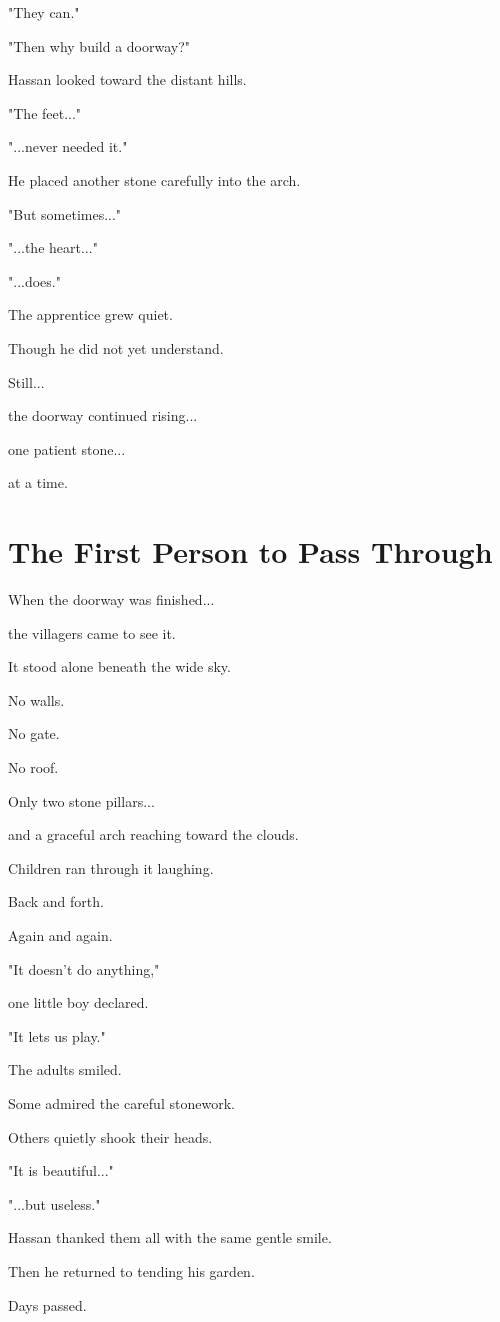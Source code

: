 \documentclass[12pt,openany]{book}
\begin{document}
"They can."

"Then why build a doorway?"

Hassan looked toward the distant hills.

"The feet..."

"...never needed it."

He placed another stone carefully into the arch.

"But sometimes..."

"...the heart..."

"...does."

The apprentice grew quiet.

Though he did not yet understand.

Still...

the doorway continued rising...

one patient stone...

at a time.
\section*{The First Person to Pass Through}

When the doorway was finished...

the villagers came to see it.

It stood alone beneath the wide sky.

No walls.

No gate.

No roof.

Only two stone pillars...

and a graceful arch reaching toward the clouds.

Children ran through it laughing.

Back and forth.

Again and again.

"It doesn't do anything,"

one little boy declared.

"It lets us play."

The adults smiled.

Some admired the careful stonework.

Others quietly shook their heads.

"It is beautiful..."

"...but useless."

Hassan thanked them all with the same gentle smile.

Then he returned to tending his garden.

Days passed.
\end{document}
